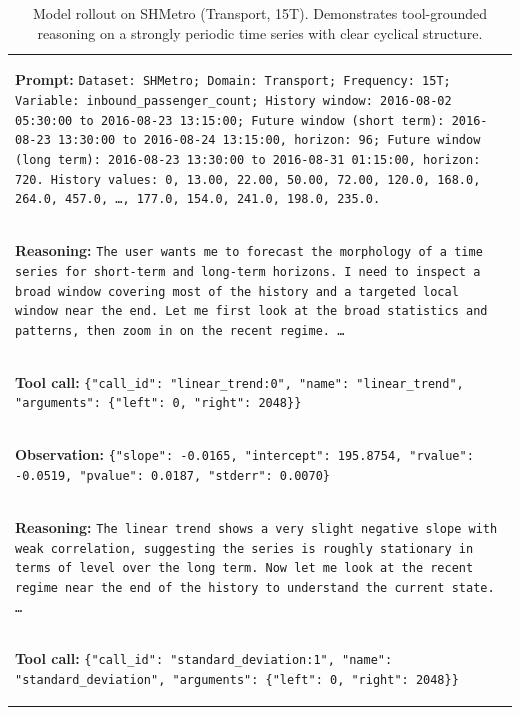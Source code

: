 \documentclass[11pt]{article}
\begin{document}
\begin{table}[t]
\caption{Model rollout on SHMetro (Transport, 15T). Demonstrates tool-grounded reasoning on a strongly periodic time series with clear cyclical structure.}
\label{tab:tstar_success_case}
\centering
\small
\begin{tabular}{p{}}
\toprule
\colorbox{gray!10}{\parbox{0.95\textwidth}{%
\textbf{Prompt:}
\texttt{Dataset: SHMetro; Domain: Transport; Frequency: 15T; Variable:
inbound\_passenger\_count; History window: 2016-08-02 05:30:00 to
2016-08-23 13:15:00; Future window (short term): 2016-08-23 13:30:00 to
2016-08-24 13:15:00, horizon: 96; Future window (long term):
2016-08-23 13:30:00 to 2016-08-31 01:15:00, horizon: 720. History values:
0, 13.00, 22.00, 50.00, 72.00, 120.0, 168.0, 264.0, 457.0, \ldots,
177.0, 154.0, 241.0, 198.0, 235.0.}
}} \\

\hdashline

\colorbox{green!10}{\parbox{0.95\textwidth}{%
\textbf{Reasoning:}
\texttt{The user wants me to forecast the morphology of a time series for
short-term and long-term horizons. I need to inspect a broad window covering
most of the history and a targeted local window near the end. Let me first look
at the broad statistics and patterns, then zoom in on the recent regime. \ldots}
}} \\

\hdashline

\colorbox{red!10}{\parbox{0.95\textwidth}{%
\textbf{Tool call:}
\texttt{\{"call\_id": "linear\_trend:0", "name": "linear\_trend",
"arguments": \{"left": 0, "right": 2048\}\}}
}} \\

\colorbox{blue!10}{\parbox{0.95\textwidth}{%
\textbf{Observation:}
\texttt{\{"slope": -0.0165, "intercept": 195.8754, "rvalue": -0.0519,
"pvalue": 0.0187, "stderr": 0.0070\}}
}} \\

\hdashline

\colorbox{green!10}{\parbox{0.95\textwidth}{%
\textbf{Reasoning:}
\texttt{The linear trend shows a very slight negative slope with weak
correlation, suggesting the series is roughly stationary in terms of level over
the long term. Now let me look at the recent regime near the end of the history
to understand the current state. \ldots}
}} \\

\hdashline

\colorbox{red!10}{\parbox{0.95\textwidth}{%
\textbf{Tool call:}
\texttt{\{"call\_id": "standard\_deviation:1", "name": "standard\_deviation",
"arguments": \{"left": 0, "right": 2048\}\}}
}} \\


\end{tabular}
\end{table}
\end{document}
